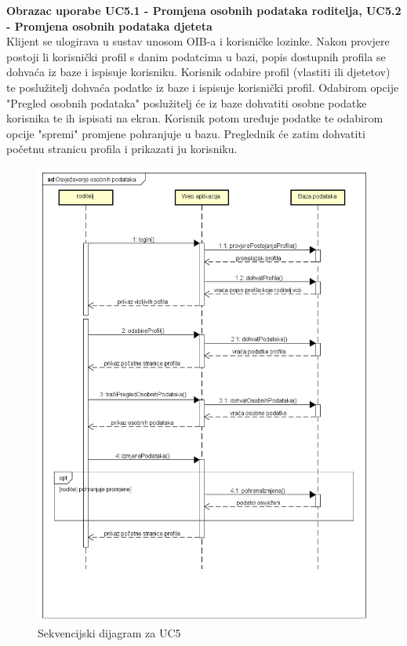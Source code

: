 				\eject
				
				
				\textbf{Obrazac uporabe UC5.1 - Promjena osobnih podataka roditelja, UC5.2 - Promjena osobnih podataka djeteta}\\
			
				
				Klijent se ulogirava u sustav unosom OIB-a i korisničke lozinke. Nakon provjere postoji li korisnički profil s danim podatcima u bazi, popis dostupnih profila se dohvaća iz baze i ispisuje korisniku. Korisnik odabire profil (vlastiti ili djetetov) te poslužitelj dohvaća podatke iz baze i ispisuje korisnički profil. Odabirom opcije "Pregled osobnih podataka" poslužitelj će iz baze dohvatiti osobne podatke korisnika te ih ispisati na ekran. Korisnik potom uređuje podatke te odabirom opcije "spremi" promjene pohranjuje u bazu. Preglednik će zatim dohvatiti početnu stranicu profila i prikazati ju korisniku.
				\eject
				
				\begin{figure}[H]
					\includegraphics[scale=0.6]{dijagrami/OsobniPodatci.PNG} %
					\centering
					\caption{Sekvencijski dijagram za UC5}
					\label{fig:sekvencijski1}
				\end{figure}
				
